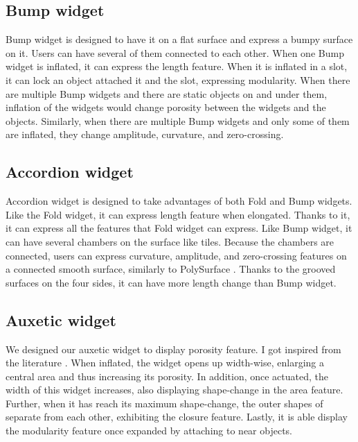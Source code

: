     \subsection{Bump widget}
      Bump widget is designed to have it on a flat surface and express a bumpy
      surface on it.  Users can have several of them connected to each other.
      When one Bump widget is inflated, it can express the length feature.
      When it is inflated in a slot, it can lock an object attached it and the
      slot, expressing modularity.  When there are multiple Bump widgets and
      there are static objects on and under them, inflation of the widgets
      would change porosity between the widgets and the objects.  Similarly,
      when there are multiple Bump widgets and only some of them are inflated,
      they change amplitude, curvature, and zero-crossing.
        
    \subsection{Accordion widget}
      Accordion widget is designed to take advantages of both Fold and Bump
      widgets. Like the Fold widget, it can express length feature when
      elongated. Thanks to it, it can express all the features that Fold
      widget can express.  Like Bump widget, it can have several chambers on
      the surface like tiles.  Because the chambers are connected, users can
      express curvature, amplitude, and zero-crossing features on a connected
      smooth surface, similarly to PolySurface \cite{everitt2017polysurface}.
      Thanks to the grooved surfaces on the four sides, it can have more
      length change than Bump widget.
        
    \subsection{Auxetic widget}
      We designed our auxetic widget to display porosity feature. I got
      inspired from the literature \cite{grima2006auxetic}. When inflated, the
      widget opens up width-wise, enlarging a central area and thus increasing
      its porosity. In addition, once actuated, the width of this widget
      increases, also displaying shape-change in the area feature. Further,
      when it has reach its maximum shape-change, the outer shapes of separate
      from each other, exhibiting the closure feature. Lastly, it is able
      display the modularity feature once expanded by attaching to near
      objects.


